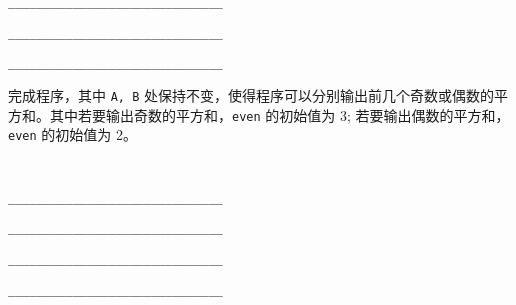 \begin{problems}
{\begin{compactenum}[A：]
            \item \verb|______________________________|
            \item \verb|______________________________|
            \item \verb|______________________________|
        \end{compactenum}}
        \qn 完成程序，其中 \verb|A, B| 处保持不变，使得程序可以分别输出前几个奇数或偶数的平方和。其中若要输出奇数的平方和，\verb|even| 的初始值为 3; 若要输出偶数的平方和，\verb|even| 的初始值为 2。
        {\tt
        \begin{compactenum}[A：]
            \item \verb|______________________________|
            \item \verb|______________________________|
            \item \verb|______________________________|
            \item \verb|______________________________|
        \end{compactenum}}
    \end{problems}